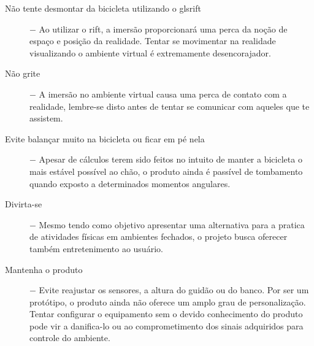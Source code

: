 \begin{description}
	\item [Não tente desmontar da bicicleta utilizando o gls{rift}] $-$ Ao utilizar o \gls{rift}, a imersão proporcionará uma perca da noção de espaço e posição da realidade. Tentar se movimentar na realidade visualizando o ambiente virtual é extremamente desencorajador.
	\item [Não grite] $-$ A imersão no ambiente virtual causa uma perca de contato com a realidade, lembre-se disto antes de tentar se comunicar com aqueles que te assistem.
	\item [Evite balançar muito na bicicleta ou ficar em pé nela] $-$ Apesar de cálculos terem sido feitos no intuito de manter a bicicleta o mais estável possível ao chão, o produto ainda é passível de tombamento quando exposto a determinados momentos angulares.
	\item [Divirta-se] $-$ Mesmo tendo como objetivo apresentar uma alternativa para a pratica de atividades físicas em ambientes fechados, o projeto busca oferecer também entretenimento ao usuário.
	\item [Mantenha o produto] $-$ Evite reajustar os sensores, a altura do guidão ou do banco. Por ser um protótipo, o produto ainda não oferece um amplo grau de personalização. Tentar configurar o equipamento sem o devido conhecimento do produto pode vir a danifica-lo ou  ao comprometimento dos sinais adquiridos para controle do ambiente.
\end{description}